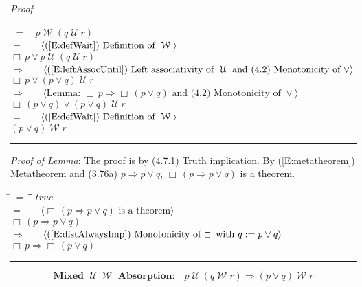 \documentclass[12pt, fleqn, leqno]{article}
\newcommand{\lgap}{2pt}                             %
\newcommand{\mymathindent}{24pt}                    %
\newcommand{\impl}{\ensuremath{\Rightarrow}}        %
\newcommand{\Until}{\;\mathcal{U}\;}
\newcommand{\Wait}{\;\mathcal{W}\;}
\newcommand{\Always}{\Box\,}
\newcommand{\myqed}{\rule[-.23ex]{1.2ex}{2.0ex}}
\newcommand{\myqedtab}{\hspace{384pt}}              %
\newcommand{\Gll} {\langle}                         %
\newcommand{\Ggg} {\rangle}                         %
\newcommand{\Hint}[1]     {\ \ \ $\Gll              \mbox{#1} \Ggg$ }   %
\begin{document}
\emph{Proof}:
\begin{tabbing}
\hspace{\mymathindent} \= $= \;$ \= \myqedtab \= \kill
\> \>   $p \Wait (q \Until r)$\\[\lgap]
\> $=$ \> \Hint{(\ref{E:defWait}) Definition of $\Wait$} \\[\lgap]
\> \>   $\Always p \lor p\Until ( q \Until r)$\\[\lgap]
\> $\impl$ \> \Hint{(\ref{E:leftAssocUntil}) Left associativity of $\Until$ and (4.2) Monotonicity of $\lor$} \\[\lgap]
\> \>   $\Always p\lor (p\lor q) \Until r$\\[\lgap]
  \> $\impl$  \>  \Hint{Lemma: $\Always p \impl \Always (p \lor q)$ and (4.2) Monotonicity of $\lor$}\\[\lgap]
\> \>   $\Always (p \lor q) \lor (p\lor q) \Until r$\\[\lgap]
\> $=$ \> \Hint{(\ref{E:defWait}) Definition of $\Wait$} \\[\lgap]
\> \>   $(p\lor q) \Wait r$ \quad \myqed
\end{tabbing}

\emph{Proof of Lemma}: The proof is by (4.7.1) Truth implication.
By (\ref{E:metatheorem}) Metatheorem and (3.76a) $p\impl p\lor q$, $\Always (p\impl p\lor q)$ is a theorem.
\begin{tabbing}
\hspace{\mymathindent} \= $= \;$ \= \myqedtab \= \kill
  \> \>   $true$\\[\lgap]
  \> $=$ \> \Hint{$\Always (p\impl p\lor q)$ is a theorem} \\[\lgap]
  \> \>   $\Always (p\impl p\lor q)$\\[\lgap]
  \> $\impl$  \>  \Hint{(\ref{E:distAlwaysImp}) Monotonicity of $\Always$ with $q :=  p\lor q$}\\[\lgap]
  \> \>   $\Always p \impl \Always (p \lor q)$ \quad \myqed
\end{tabbing}

\begin{equation}\label{E:mix5untilImpAbsR}
\textbf{Mixed $\Until\Wait$ Absorption:}\quad p \Until (q \Wait r) \impl (p \lor q) \Wait r
\end{equation}
\end{document}

